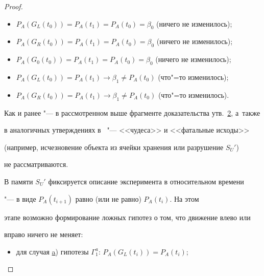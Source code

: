 \begin{proof}
\begin{itemize}



\item[a)] \hypertarget{kr:a1}{} $P_{A}(G_{L}(t_{0})) = P_{A}(t_{1}) = P_{A}(t_{0}) = \beta_0$ (ничего не изменилось);



\item[b)] \hypertarget{kr:b1}{} $P_{A}(G_{R}(t_{0})) = P_{A}(t_{1}) = P_{A}(t_{0}) = \beta_0$ (ничего не изменилось);



\item[c)] \hypertarget{kr:c1}{} $P_{A}(G_{0}(t_{0})) = P_{A}(t_{1}) = P_{A}(t_{0}) = \beta_0$ (ничего не изменилось);



\item[d)] \hypertarget{kr:d1}{} $P_{A}(G_{L}(t_{0})) = P_{A}(t_{1}) \to \beta_1 \ne  P_{A}(t_{0})$ (что"=то изменилось);



\item[e)] \hypertarget{kr:e1}{} $P_{A}(G_{R}(t_{0})) = P_{A}(t_{1}) \to \beta_1 \ne  P_{A}(t_{0})$ (что"=то изменилось).





\end{itemize}



Как и ранее "--- в рассмотренном выше фрагменте доказательства утв.~\hyperlink{kr:utv2}{2}, а~также

в аналогичных утверждениях в~\cite{krylov:bib3} "--- <<чудеса>> и <<фатальные исходы>>

(например, исчезновение объекта из ячейки хранения или разрушение $S_{U}'$)

не рассматриваются.



В памяти $S_{U}'$ фиксируется описание эксперимента в относительном времени

"--- в виде $P_{A}(t_{i+1})$ равно (или не равно) $P_{A}(t_{i})$. На этом

этапе возможно формирование ложных гипотез о том, что движение влево или

вправо ничего не меняет:

\begin{itemize}

\item[--] для случая \hyperlink{kr:a1}{a}) гипотезы $\Gamma^{a}_{1}$: $P_{A}(G_{L}(t_{i})) = P_{A}(t_{i})$; 


\end{itemize}
\end{proof}
